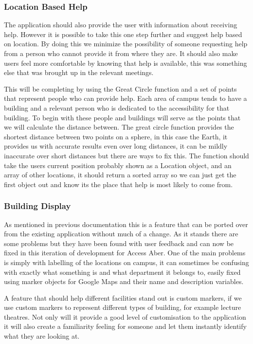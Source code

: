 \subsubsection{Location Based Help}
The application should also provide the user with information about receiving help. However it is possible to take this one step further and suggest help based on location. By doing this we minimize the possibility of someone requesting help from a person who cannot provide it from where they are. It should also make users feel more comfortable by knowing that help is available, this was something else that was brought up in the relevant meetings. 

This will be completing by using the Great Circle function and a set of points that represent people who can provide help. Each area of campus tends to have a building and a relevant person who is dedicated to the accessibility for that building. To begin with these people and buildings will serve as the points that we will calculate the distance between. The great circle function provides the shortest distance between two points on a sphere, in this case the Earth, it provides us with accurate results even over long distances, it can be mildly inaccurate over short distances but there are ways to fix this. The function should take the users current position probably shown as a Location object, and an array of other locations, it should return a sorted array so we can just get the first object out and know its the place that help is most likely to come from. 
\subsubsection{Building Display}
As mentioned in previous documentation this is a feature that can be ported over from the existing application without much of a change. As it stands there are some problems but they have been found with user feedback and can now be fixed in this iteration of development for Access Aber. One of the main problems is simply with labelling of the locations on campus, it can sometimes be confusing with exactly what something is and what department it belongs to, easily fixed using marker objects for Google Maps and their name and description variables. 

A feature that should help different facilities stand out is custom markers, if we use custom markers to represent different types of building, for example lecture theatres. Not only will it provide a good level of customisation to the application it will also create a familiarity feeling for someone and let them instantly identify what they are looking at. 

